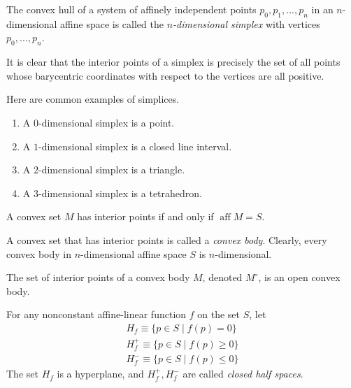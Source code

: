 \documentclass{article}
\DeclareMathOperator{\aff}{aff}
\begin{document}
    \begin{definition}
      The convex hull of a system of affinely independent points $p_0, p_1, ..., p_n$ in an $n$-dimensional affine space is called the \textit{$n$-dimensional simplex} with vertices $p_0, ..., p_n$. 
    \end{definition}

    It is clear that the interior points of a simplex is precisely the set of all points whose barycentric coordinates with respect to the vertices are all positive. 

    \begin{example}
      Here are common examples of simplices.
      \begin{enumerate}
        \item A $0$-dimensional simplex is a point. 
        \item A $1$-dimensional simplex is a closed line interval. 
        \item A $2$-dimensional simplex is a triangle. 
        \item A $3$-dimensional simplex is a tetrahedron. 
      \end{enumerate}
    \end{example}

    \begin{proposition}
    A convex set $M$ has interior points if and only if $\aff M = S$. 
    \end{proposition}

    \begin{definition}
    A convex set that has interior points is called a \textit{convex body}. Clearly, every convex body in $n$-dimensional affine space $S$ is $n$-dimensional. 
    \end{definition}

    The set of interior points of a convex body $M$, denoted $M^\circ$, is an open convex body. 

    \begin{definition}
    For any nonconstant affine-linear function $f$ on the set $S$, let
    \begin{align*}
        H_f \equiv \{p \in S \;|\; f(p) = 0\} \\
        H^+_f \equiv \{p \in S \;|\; f(p) \geq 0\} \\
        H^-_f \equiv \{p \in S \;|\; f(p) \leq 0\}
    \end{align*}
    The set $H_f$ is a hyperplane, and $H^+_f, H^-_f$ are called \textit{closed half spaces}. 
    \end{definition}
\end{document}
